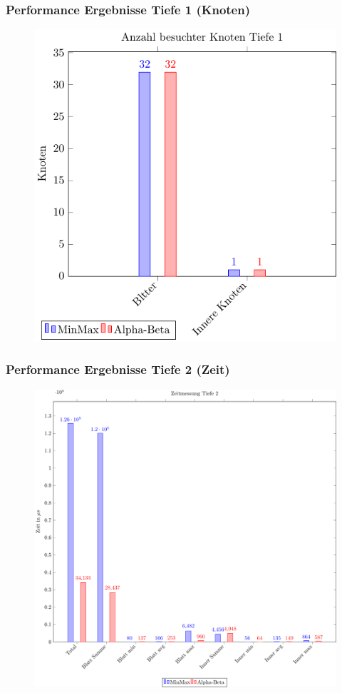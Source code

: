 \documentclass{beamer}
\begin{document}
\begin{frame}
\frametitle{Performance Ergebnisse Tiefe 1 (Knoten)}
  \begin{figure}
    \centering
    \includegraphics[scale=0.8]{figures/node-1.pdf}
  \end{figure}

\end{frame}


\begin{frame}
\frametitle{Performance Ergebnisse Tiefe 2 (Zeit)}
  \begin{figure}
    \centering
    \includegraphics[scale=0.4]{figures/time-2.pdf}
  \end{figure}

\end{frame}
\end{document}
